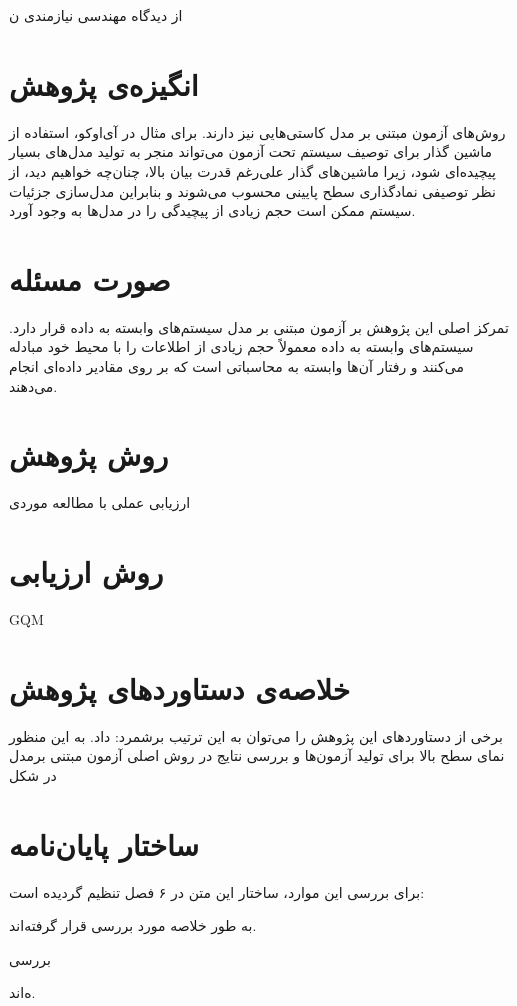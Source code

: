 از دیدگاه مهندسی نیازمند‌ی ن
\section{انگیزه‌ی پژوهش}
روش‌های آزمون مبتنی بر مدل کاستی‌هایی نیز دارند. برای مثال در آی‌اوکو، استفاده از ماشین گذار برای توصیف سیستم تحت آزمون می‌تواند منجر به تولید مدل‌های بسیار پیچیده‌ای شود، زیرا ماشین‌های گذار علی‌رغم قدرت بیان بالا، چنا‌ن‌چه خواهیم دید، از نظر توصیفی نمادگذاری سطح پایینی محسوب می‌شوند و بنابراین مدل‌سازی جزئیات سیستم ممکن است حجم زیادی از پیچیدگی را در مدل‌ها به وجود آورد.

\section{صورت مسئله}
تمرکز اصلی این پژوهش بر آزمون مبتنی بر مدل سیستم‌های وابسته به داده قرار دارد. سیستم‌های وابسته به داده معمولاً حجم زیادی از اطلاعات را با محیط خود مبادله‌ می‌‌کنند و رفتار آن‌ها وابسته به محاسباتی است که بر روی مقادیر داده‌ای انجام می‌دهند. 
 
\section{روش پژوهش}
ارزیابی عملی با مطالعه موردی
\section{روش ارزیابی}
GQM
\section{خلاصه‌ی دستاوردهای پژوهش}
برخی از دستاوردهای این پژوهش را می‌توان به این ترتیب برشمرد:
داد. به این منظور نمای سطح بالا برای تولید آزمون‌ها و بررسی نتایج در روش اصلی آزمون مبتنی برمدل در شکل

\section{ساختار پایان‌نامه}
برای بررسی این موارد، ساختار این متن در ۶ فصل تنظیم گردیده است:
\begin{strict_itemize}
\item
 به طور خلاصه مورد بررسی قرار گرفته‌اند.
\item
 بررسی 
\item
ه‌اند.
\item
\end{strict_itemize}
